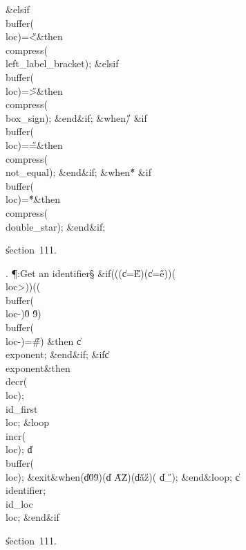\4\&{elsif}\1\8\\{buffer}\?\1(\?\\{loc}\?\2)=\?\H{<}\2\8\&{then}\6
\\{compress}\?\1(\?\\{left\_label\_bracket}\?\2)\?;\6
\4\&{elsif}\1\8\\{buffer}\?\1(\?\\{loc}\?\2)=\?\H{>}\2\8\&{then}\6
\\{compress}\?\1(\?\\{box\_sign}\?\2)\?;\2\6
\&{end}\8\2\&{if}\1;\6
\4\&{when}\8\H{/}\KR\6
\&{if}\1\1\8\\{buffer}\?\1(\?\\{loc}\?\2)=\?\H{=}\2\8\&{then}\6
\\{compress}\?\1(\?\\{not\_equal}\?\2)\?;\2\6
\&{end}\8\2\&{if}\1;\6
\4\&{when}\8\H{*}\KR\6
\&{if}\1\1\8\\{buffer}\?\1(\?\\{loc}\?\2)=\?\H{*}\2\8\&{then}\6
\\{compress}\?\1(\?\\{double\_star}\?\2)\?;\2\6
\&{end}\8\2\&{if}\1;\par
\U section~111.\fi

. \P\?:Get an identifier\X\S\?\6
\&{if}\1\1\?\8\1(\1(\1(\?\|c\?=\?\H{E}\?\2)\V\1(\?\|c\?=\?\H{e}\?\2)\2)\W\1(\?%
\\{loc}\?>\?\2)\2)\ANT\1(\1(\?\\{buffer}\?\1(\?\\{loc}\?-\?\2)\in\?\H{0}%
\?\to\?\H{9}\?\2)\V\?\\{buffer}\?\1(\?\\{loc}\?-\?\2)=\?\H{\#}\?\2)\?\2\8%
\&{then}\6
\|c\?\K\?\\{exponent};\2\6
\&{end}\8\2\&{if}\1;\6
\&{if}\1\1\8\|c\?\I\?\\{exponent}\2\8\&{then}\6
\\{decr}\?\1(\?\\{loc}\?\2)\?;\5
\\{id\_first}\?\K\?\\{loc};\6
\1\&{loop}\6
\\{incr}\?\1(\?\\{loc}\?\2)\?;\5
\|d\?\K\?\\{buffer}\?\1(\?\\{loc}\?\2)\?;\6
\?\&{exit}\8\&{when}\8\1(\?\|d\?\notin\?\H{0}\?\to\?\H{9}\?\2)\W\1(\?\|d\?%
\notin\?\H{A}\?\to\?\H{Z}\?\2)\W\1(\?\|d\?\notin\?\H{a}\?\to\?\H{z}\?\2)\W\1(\?%
\|d\?\I\?\H{\_}\?\2)\?;\2\6
\&{end}\8\&{loop};\6
\|c\?\K\?\\{identifier};\5
\\{id\_loc}\?\K\?\\{loc};\2\6
\&{end}\8\2\&{if}\1\par
\U section~111.\fi


